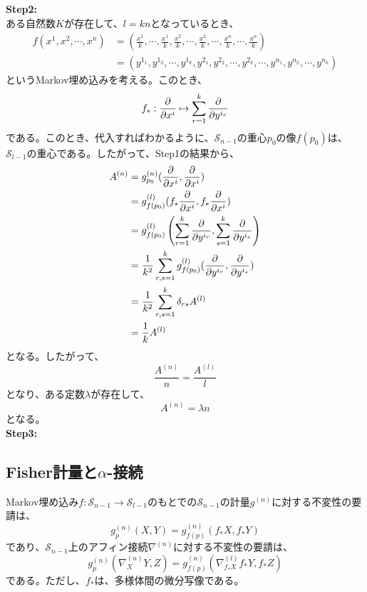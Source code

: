 \documentclass[a4paper,11pt]{jsarticle}
\numberwithin{equation}{section}
\begin{document}
\textbf{Step2:}\\
ある自然数$K$が存在して、$l = kn$となっているとき、
\begin{align}
    f(x^1,x^2,\cdots,x^n) &= \left(\frac{x^1}{k},\cdots,\frac{x^1}{k},\frac{x^2}{k},\cdots,\frac{x^2}{k},\cdots,\frac{x^n}{k},\cdots,\frac{x^n}{k}\right)\\
    &= (y^{1_1},y^{1_2},\cdots,y^{1_k},y^{2_1},y^{2_2},\cdots,y^{2_k},\cdots,y^{n_1},y^{n_2},\cdots,y^{n_k})
\end{align}
というMarkov埋め込みを考える。このとき、
\begin{equation}
    f_* : \pdv{x^i} \mapsto \sum_{r=1}^{k} \pdv{y^{i_r}}
\end{equation}
である。このとき、代入すればわかるように、$\mathcal{S}_{n-1}$の重心$p_0$の像$f(p_0)$は、$\mathcal{S}_{l-1}$の重心である。したがって、Step1の結果から、
\begin{align}
    A^{(n)} &= g^{(n)}_{p_0}(\pdv{x^i},\pdv{x^i})\\
    &= g_{f(p_0)}^{(l)}(f_*\pdv{x^i},f_*\pdv{x^i})\\
    &= g_{f(p_0)}^{(l)}\left(\sum_{r=1}^{k} \pdv{y^{i_r}},\sum_{s=1}^{k} \pdv{y^{i_s}}\right)\\
    &= \frac{1}{k^2} \sum_{r,s=1}^{k} g_{f(p_0)}^{(l)}(\pdv{y^{i_r}},\pdv{y^{i_s}})\\
    &= \frac{1}{k^2} \sum_{r,s=1}^{k} \delta_{rs} A^{(l)}\\
    &= \frac{1}{k} A^{(l)}
\end{align}
となる。したがって、
\begin{equation}
    \frac{A^{(n)}}{n} = \frac{A^{(l)}}{l}
\end{equation}
となり、ある定数$\lambda$が存在して、
\begin{equation}
    A^{(n)} = \lambda n
\end{equation}
となる。\\

\textbf{Step3:}\\

\subsection{Fisher計量と$\alpha$-接続}
Markov埋め込み$f: \mathcal{S}_{n-1} \to \mathcal{S}_{l-1}$のもとでの$\mathcal{S}_{n-1}$の計量$g^{(n)}$に対する不変性の要請は、
\begin{equation}
    \label{eq:1}
    g^{(n)}_p(X,Y) = g^{(n)}_{f(p)}(f_*X,f_*Y)
\end{equation}
であり、$\mathcal{S}_{n-1}$上のアフィン接続$\nabla^{(n)}$に対する不変性の要請は、
\begin{equation}
    \label{eq:2}
    g^{(n)}_p(\nabla^{(n)}_X Y,Z) = g^{(n)}_{f(p)}(\nabla^{(l)}_{f_*X} f_*Y,f_*Z)
\end{equation}
である。ただし、$f_*$は、多様体間の微分写像である。\\
\end{document}

